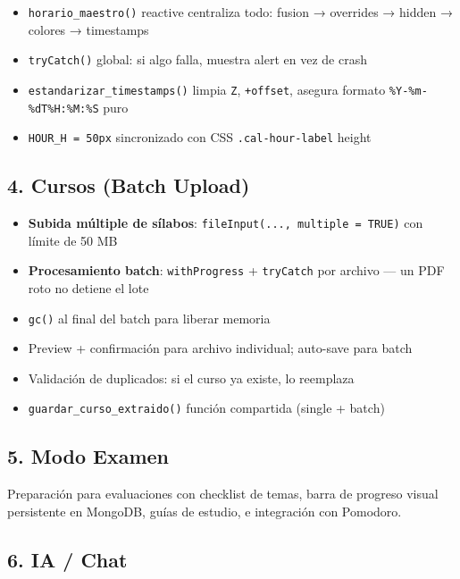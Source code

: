 \documentclass[
  spanish,
  11pt,
  a4paper,
]{article}
\providecommand{\tightlist}{%
  \setlength{\itemsep}{0pt}\setlength{\parskip}{0pt}}
\begin{document}
\begin{itemize}
\tightlist
\item
  \texttt{horario\_maestro()} reactive centraliza todo: fusion →
  overrides → hidden → colores → timestamps
\item
  \texttt{tryCatch()} global: si algo falla, muestra alert en vez de
  crash
\item
  \texttt{estandarizar\_timestamps()} limpia \texttt{Z},
  \texttt{+offset}, asegura formato \texttt{\%Y-\%m-\%dT\%H:\%M:\%S}
  puro
\item
  \texttt{HOUR\_H\ =\ 50px} sincronizado con CSS
  \texttt{.cal-hour-label} height
\end{itemize}

\subsection{4. Cursos (Batch Upload)}\label{cursos-batch-upload}

\begin{itemize}
\tightlist
\item
  \textbf{Subida múltiple de sílabos}:
  \texttt{fileInput(...,\ multiple\ =\ TRUE)} con límite de 50 MB
\item
  \textbf{Procesamiento batch}: \texttt{withProgress} +
  \texttt{tryCatch} por archivo --- un PDF roto no detiene el lote
\item
  \texttt{gc()} al final del batch para liberar memoria
\item
  Preview + confirmación para archivo individual; auto-save para batch
\item
  Validación de duplicados: si el curso ya existe, lo reemplaza
\item
  \texttt{guardar\_curso\_extraido()} función compartida (single +
  batch)
\end{itemize}

\subsection{5. Modo Examen}\label{modo-examen}

Preparación para evaluaciones con checklist de temas, barra de progreso
visual persistente en MongoDB, guías de estudio, e integración con
Pomodoro.

\subsection{6. IA / Chat}\label{ia-chat}
\end{document}
